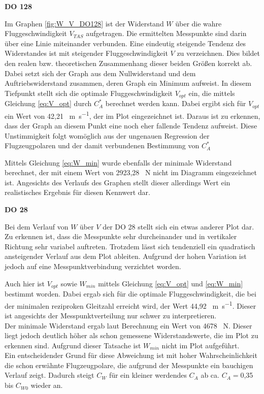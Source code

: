 \textbf{DO 128}

Im Graphen \ref{fig:W_V_DO128} ist der Widerstand $W$ über die wahre Fluggeschwindigkeit $V_{TAS}$ aufgetragen. Die ermittelten Messpunkte sind darin über eine Linie miteinander verbunden. Eine eindeutig steigende Tendenz des Widerstandes ist mit steigender Fluggeschwindigkeit $V$ zu verzeichnen. Dies bildet den realen bzw. theoretischen Zusammenhang dieser beiden Größen korrekt ab. Dabei setzt sich der Graph aus dem Nullwiderstand und dem Auftriebswiderstand zusammen, deren Graph ein Minimum aufweist.
In diesem Tiefpunkt stellt sich die optimale Fluggeschwindigkeit $V_{opt}$ ein, die mittels Gleichung \ref{eq:V_opt} durch $C_A^*$ berechnet werden kann. Dabei ergibt sich für $V_{opt}$ ein Wert von 42,21 \SI{}{\meter\per\second}, der im Plot eingezeichnet ist. Daraus ist zu erkennen, dass der Graph an diesem Punkt eine noch eher fallende Tendenz aufweist. Diese Unstimmigkeit folgt womöglich aus der ungenauen Regression der Flugzeugpolaren und der damit verbundenen Bestimmung von $C_A^*$

Mittels Gleichung \ref{eq:W_min} wurde ebenfalls der minimale Widerstand berechnet, der mit einem Wert von 2923,28 \SI{}{\newton} nicht im Diagramm eingezeichnet ist. Angesichts des Verlaufs des Graphen stellt dieser allerdings Wert ein realistisches Ergebnis für diesen Kennwert dar.

\textbf{DO 28}

Bei dem Verlauf von $W$ über $V$ der DO 28 stellt sich ein etwas anderer Plot dar. Zu erkennen ist, dass die Messpunkte sehr durcheinander und in vertikaler Richtung sehr variabel auftreten. Trotzdem lässt sich tendenziell ein quadratisch ansteigender Verlauf aus dem Plot ableiten. Aufgrund der hohen Variation ist jedoch auf eine Messpunktverbindung verzichtet worden.

Auch hier ist $V_{opt}$ sowie $W_{min}$ mittels Gleichung \ref{eq:V_opt} und \ref{eq:W_min} bestimmt worden. Dabei ergab sich für die optimale Fluggeschwindigkeit, die bei der minimalen reziproken Gleitzahl erreicht wird, der Wert 44,92 \SI{}{\meter\per\second}. Dieser ist angesichts der Messpunktverteilung nur schwer zu interpretieren. \\ Der minimale Widerstand ergab laut Berechnung ein Wert von 4678 \SI{}{\newton}. Dieser liegt jedoch deutlich höher als schon gemessene Widerstandswerte, die im Plot zu erkennen sind. Aufgrund dieser Tatsache ist $W_{min}$ nicht im Plot aufgeführt. \\
Ein entscheidender Grund für diese Abweichung ist mit hoher Wahrscheinlichkeit die schon erwähnte Flugzeugpolare, die aufgrund der Messpunkte ein bauchigen Verlauf zeigt. Dadurch steigt $C_W$ für ein kleiner werdendes $C_A$ ab ca. $C_A=$0,35 bis $C_{W0}$ wieder an.

